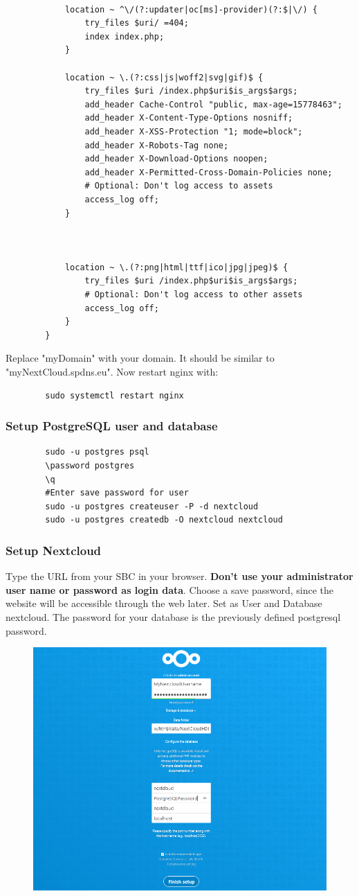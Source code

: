 \documentclass[a4paper,12pt]{article}
\begin{document}
\begin{verbatim}
			
			location ~ ^\/(?:updater|oc[ms]-provider)(?:$|\/) {
				try_files $uri/ =404;
				index index.php;
			}
			
			location ~ \.(?:css|js|woff2|svg|gif)$ {
				try_files $uri /index.php$uri$is_args$args;
				add_header Cache-Control "public, max-age=15778463";
				add_header X-Content-Type-Options nosniff;
				add_header X-XSS-Protection "1; mode=block";
				add_header X-Robots-Tag none;
				add_header X-Download-Options noopen;
				add_header X-Permitted-Cross-Domain-Policies none;
				# Optional: Don't log access to assets
				access_log off;
			}
			
			
			
			location ~ \.(?:png|html|ttf|ico|jpg|jpeg)$ {
				try_files $uri /index.php$uri$is_args$args;
				# Optional: Don't log access to other assets
				access_log off;
			}
		}
	\end{verbatim}
	Replace "myDomain" with your domain. It should be similar to "myNextCloud.spdns.eu".
	Now restart nginx with:
	\begin{verbatim}
		sudo systemctl restart nginx
	\end{verbatim}
	\subsubsection{Setup PostgreSQL user and database}
	\begin{verbatim}
		sudo -u postgres psql
		\password postgres
		\q
		#Enter save password for user
		sudo -u postgres createuser -P -d nextcloud
		sudo -u postgres createdb -O nextcloud nextcloud
	\end{verbatim}
	\subsubsection{Setup Nextcloud}
	Type the URL from your SBC in your browser.
	\textbf{Don't use your administrator user name or password as login data}. Choose a save password, since the website will be accessible through the web later.
	Set as User and Database nextcloud. The password for your database is the previously defined postgresql password.
	\begin{figure}
		\includegraphics{images/NextcloudSetup}
	\end{figure}
\end{document}
